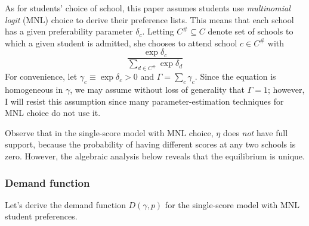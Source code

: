 \documentclass[12pt]{article}
\theoremstyle{definition}
\begin{document}
As for students' choice of school, this paper assumes students use \emph{multinomial logit} (MNL) choice to derive their preference lists. This means that each school has a given preferability parameter $\delta_c$. Letting $C^\# \subseteq C$ denote set of schools to which a given student is admitted, she chooses to attend school $c \in C^\#$ with
\[\frac{\exp \delta_c}{\sum_{d \in C^\#} \exp \delta_d}\]
For convenience, let $\gamma_c \equiv \exp \delta_c > 0$ and $\Gamma = \sum_c \gamma_c$. Since the equation is homogeneous in $\gamma$, we may assume without loss of generality that $\Gamma = 1$; however, I will resist this assumption since many parameter-estimation techniques for MNL choice do not use it. 

Observe that in the single-score model with MNL choice, $\eta$ does \emph{not} have full support, because the probability of having different scores at any two schools is zero. However, the algebraic analysis below reveals that the equilibrium is unique. 

\subsubsection{Demand function}
Let's derive the demand function $D(\gamma, p)$ for the single-score model with MNL student preferences.
\end{document}
